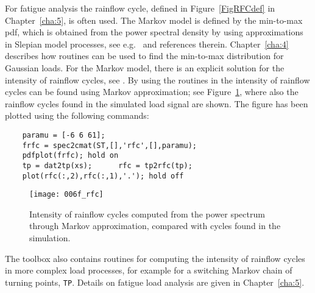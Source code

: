{For fatigue analysis the rainflow cycle, defined in
Figure~\ref{FigRFCdef} in Chapter~\ref{cha:5}, is often used.
The Markov model is defined by the min-to-max pdf, which is obtained
from the power spectral density by using approximations in Slepian
model processes, see e.g.\
\cite{LindgrenAndRychlik1991Slepian} %
and references therein. Chapter~\ref{cha:4} describes how \progname{}
routines can be used to find the min-to-max distribution for Gaussian loads.
For the Markov model, there is an explicit
solution for the intensity of rainflow cycles, see
\cite{FrendahlAndRychlik1993Rainflow}. 
By using the routines in \progname{} the intensity of rainflow cycles can be
found using Markov approximation; see Figure~\ref{fig:rainflow2}, where
also the rainflow cycles found in the simulated load signal are
shown. The figure has been plotted using the following commands:
{\small\begin{verbatim}
    paramu = [-6 6 61];
    frfc = spec2cmat(ST,[],'rfc',[],paramu);
    pdfplot(frfc); hold on
    tp = dat2tp(xs);      rfc = tp2rfc(tp);
    plot(rfc(:,2),rfc(:,1),'.'); hold off
\end{verbatim}}

  \begin{figure}[tbh]
\centering
\texttt{[image: 006f\_rfc]}
\vspace{-3mm}
\caption[Intensity of rainflow cycles]{Intensity of rainflow cycles
computed from the power spectrum through
  Markov approximation, compared with cycles found in the
  simulation. }
\label{fig:rainflow2}
\end{figure}

  \noindent
  The \progname{} toolbox also contains routines for computing the intensity
  of rainflow cycles in more complex load processes, for example
  for a switching Markov chain of turning points, {\tt TP}. Details on fatigue load analysis
are given in Chapter~\ref{cha:5}.

}
